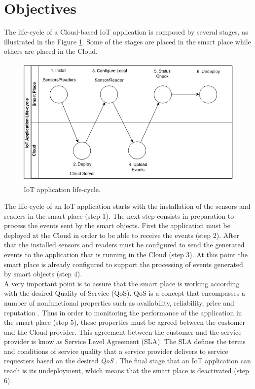 \section{Objectives}
\label{sec:objectives}
The life-cycle of a Cloud-based IoT application is composed by several stages,
as illustrated in the Figure \ref{fig:life-cycle}. Some of the stages are placed in
the smart place while others are placed in the Cloud.
\begin{figure}[h!]
  \centering
  \includegraphics[width=\textwidth]{./images/life-cycle}
  \caption{IoT application life-cycle.}
  \label{fig:life-cycle}
\end{figure}

The life-cycle of an IoT application starts with the installation of the sensors and
readers in the smart place (step 1). The next step consists in preparation to
process the events sent by the smart objects. First the application must be deployed at
the Cloud in order to be able to receive the events (step 2). After that the installed
sensors and readers must be configured to send the generated events to the application that is
running in the Cloud (step 3). At this point the smart place is already configured to
support the processing of events generated by smart objects (step 4).\\

A very important point is to assure that the smart place is working according with the
desired Quality of Service (QoS). QoS is a concept that encompasses a number of nonfunctional
properties such as availability, reliability, price and reputation \cite{o2002s}.
Thus in order to monitoring the performance of the application in the smart place (step 5),
these properties must be agreed between the customer and the Cloud provider.
This agreement between the customer and the service provider is know as Service Level Agreement (SLA).
The SLA defines the terms and conditions of service quality that a service provider delivers
to service requesters based on the desired \textit{QoS} \cite{zeng2004qos}. The final stage
that an IoT application can reach is its undeployment, which means that the smart place is deactivated (step 6).\\

